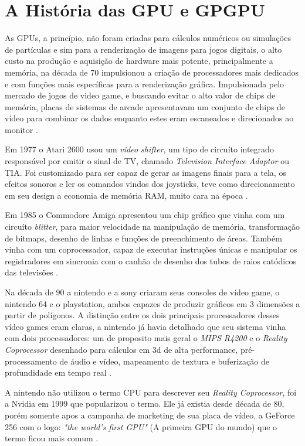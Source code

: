 \section{A História das GPU e GPGPU}
  As GPUs, a princípio, não foram criadas para cálculos numéricos ou simulações de partículas e sim para a renderização de imagens para jogos digitais, o alto custo na produção e aquisição de hardware mais potente, principalmente a memória, na década de 70 impulsionou a criação de processadores mais dedicados e com funções mais específicas para a renderização gráfica. Impulsionada pelo mercado de jogos de video game, e buscando evitar o alto valor de chips de memória, placas de sistemas de arcade apresentavam um conjunto de chips de vídeo para combinar os dados enquanto estes eram escaneados e direcionados ao monitor \citep{Hague:13}.

  Em 1977 o Atari 2600 usou um \textit{video shifter}, um tipo de circuíto integrado responsável por emitir o sinal de TV, chamado \textit{Television Interface Adaptor} ou TIA. Foi customizado para ser capaz de gerar as imagens finais para a tela, os efeitos sonoros e ler os comandos vindos dos joysticks, teve como direcionamento em seu design a economia de memória RAM, muito cara na época \citep{Hague:13} \citep{atari-field:83}.

  Em 1985 o Commodore Amiga apresentou um chip gráfico que vinha com um circuíto \textit{blitter}, para maior velocidade na manipulação de memória, transformação de bitmaps, desenho de linhas e funções de preenchimento de áreas. Também vinha com um coprocessador, capaz de executar instruções únicas e manipular os registradores em sincronia com o canhão de desenho dos tubos de raios catódicos das televisões \citep{amiga:17}.

  Na década de 90 a nintendo e a sony criaram seus consoles de vídeo game, o nintendo 64 e o playstation, ambos capazes de produzir gráficos em 3 dimensões a partir de polígonos. A distinção entre os dois principais processadores desses vídeo games eram claras, a nintendo já havia detalhado que seu sistema vinha com dois processadores: um de proposito mais geral o \textit{MIPS R4200} e o \textit{Reality Coprocessor} desenhado para cálculos em 3d de alta performance, pré-processamento de áudio e vídeo, mapeamento de textura e buferização de profundidade em tempo real \citep{manual64:98} \citep{N64Launch:96}.

  A nintendo não utilizou o termo CPU para descrever seu \textit{Reality Coprocessor}, foi a Nvidia em 1999 que popularizou o termo. Ele já existia desde década de 80, porém somente apos a campanha de marketing de sua placa de vídeo, a GeForce 256 com o logo: \textit{"the world's first GPU"} (A primeira GPU do mundo) que o termo ficou mais comum \citep{nvida256}.

